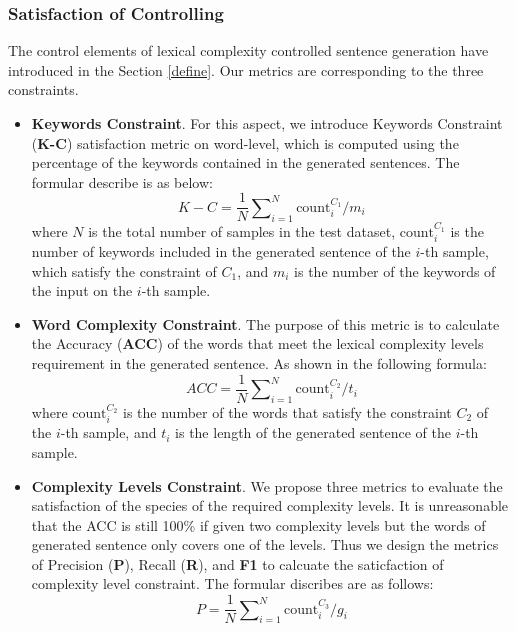 \documentclass[11pt]{article}
\begin{document}
\subsubsection{Satisfaction of Controlling} The control elements of lexical complexity controlled sentence generation have introduced in the Section \ref{define}. Our metrics are corresponding to the three constraints.
\begin{itemize}
\item \textbf{Keywords Constraint}. For this aspect, we introduce Keywords Constraint (\textbf{K-C}) satisfaction metric on word-level, which is computed using the percentage of the keywords contained in the generated sentences. The formular describe is as below:
\begin{equation}
K-C=\frac{1}{N}\sum\nolimits_{i=1}^{N}{\mathrm{count}_i^{C_1}}\big/m_i
\end{equation}
where $N$ is the total number of samples in the test dataset, $\mathrm{count}_i^{C_1}$ is the number of keywords included in the generated sentence of the $i$-th sample, which satisfy the constraint of $C_1$, and $m_i$ is the number of the keywords of the input on the $i$-th sample. 
\item \textbf{Word Complexity Constraint}. The purpose of this metric is to calculate the Accuracy (\textbf{ACC}) of the words that meet the lexical complexity levels requirement in the generated sentence. As shown in the following formula:
\begin{equation}
ACC=\frac{1}{N}\sum\nolimits_{i=1}^{N}{\mathrm{count}_i^{C_2}}\big/{t_i}
\end{equation}
where $\mathrm{count}_i^{C_2}$ is the number of the words that satisfy the constraint $C_2$ of the $i$-th sample, and $t_i$ is the length of the generated sentence of the $i$-th sample. 
\item \textbf{Complexity Levels Constraint}. We propose three metrics to evaluate the satisfaction of the species of the required complexity levels. It is unreasonable that the ACC is still 100\% if given two complexity levels but the words of generated sentence only covers one of the levels. Thus we design the metrics of Precision (\textbf{P}), Recall (\textbf{R}), and \textbf{F1} to calcuate the saticfaction of complexity level constraint. The formular discribes are as follows:
\begin{equation}
P=\frac{1}{N}\sum\nolimits_{i=1}^{N}{\mathrm{count}_i^{C_3}}\big/{g_i}
\end{equation}


\end{itemize}
\end{document}
